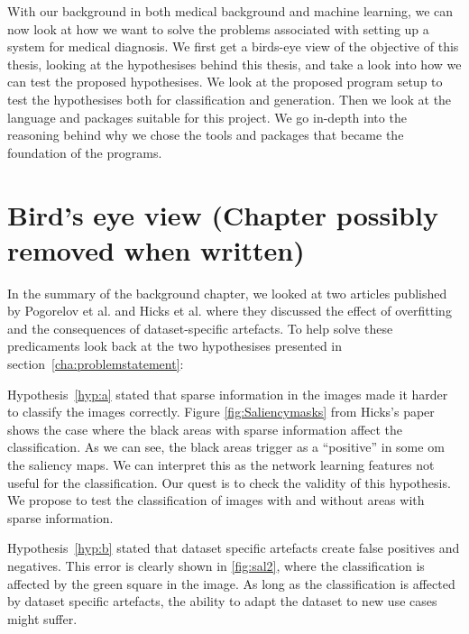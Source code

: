 With our background in both medical background and machine learning, we can now look at how we want to solve the problems associated with setting up a system for medical diagnosis.  
We first get a birds-eye view of the objective of this thesis, looking at the hypothesises behind this thesis, and take a look into how we can test the proposed hypothesises. We look at the proposed program setup to test the hypothesises both for classification and generation.
Then we look at the language and packages suitable for this project. We go in-depth into the reasoning behind why we chose the tools and packages that became the foundation of the programs. 


\section{ Bird's eye view (Chapter possibly removed when written)}
In the summary of the background chapter, we looked at two articles published by Pogorelov et al. and Hicks et al. where they discussed the effect of overfitting and the consequences of dataset-specific artefacts.
To help solve these predicaments look back at the two hypothesises presented in section~\ref{cha:problemstatement}:

\vspace{2px}
Hypothesis~\ref{hyp:a} stated that sparse information in the images made it harder to classify the images correctly. Figure \ref{fig:Saliencymasks} from Hicks's paper shows the case where the black areas with sparse information affect the classification. As we can see, the black areas trigger as a ``positive'' in some om the saliency maps. We can interpret this as the network learning features not useful for the classification. 
Our quest is to check the validity of this hypothesis. We propose to test the classification of images with and without areas with sparse information.


\vspace{5px}
Hypothesis~\ref{hyp:b} stated that dataset specific artefacts create false positives and negatives. This error is clearly shown in \ref{fig:sal2}, where the classification is affected by the green square in the image. 
As long as the classification is affected by dataset specific artefacts, the ability to adapt the dataset to new use cases might suffer.  


